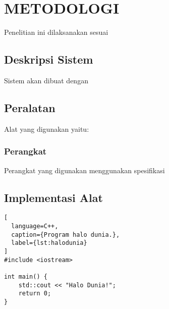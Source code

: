 \chapter{METODOLOGI}
\label{chap:metodologi}


Penelitian ini dilaksanakan sesuai \lipsum[1][1-5]

\section{Deskripsi Sistem}
\label{sec:deskripsisistem}

Sistem akan dibuat dengan \lipsum[1-2]

\section{Peralatan}
\label{sec:peralatan}

Alat yang digunakan yaitu: \lipsum[1]

\subsection{Perangkat}
\label{subsec:perangkat}

Perangkat yang digunakan menggunakan spesifikasi \lipsum[1]

\section{Implementasi Alat}
\label{sec:implementasialat}

\begin{lstlisting}[
  language=C++,
  caption={Program halo dunia.},
  label={lst:halodunia}
]
#include <iostream>

int main() {
    std::cout << "Halo Dunia!";
    return 0;
}
\end{lstlisting}

\lipsum[2-3]



\lipsum[4]
